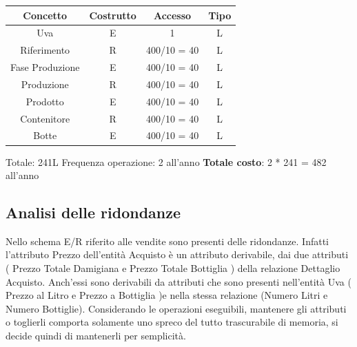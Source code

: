 \documentclass{article}
\begin{document}
\begin{itemize}
\begin{tabular}{c|c|c|c}
    \textbf{Concetto} & \textbf{Costrutto} &  \textbf{Accesso} & \textbf{Tipo} \\\hline
    Uva & E & 1 & L\\\hline
    Riferimento & R & 400/10 = 40 & L \\\hline
    Fase Produzione& E & 400/10 = 40 & L\\\hline
    Produzione & R & 400/10 = 40 & L \\\hline
    Prodotto & E & 400/10 = 40  & L\\\hline
    Contenitore & R & 400/10 = 40 & L \\\hline
    Botte& E & 400/10 = 40 & L\\\hline
\end{tabular}
\newline
Totale: 241L \qquad \qquad Frequenza operazione: 2 all'anno
\newline
\newline
\textbf{Totale costo}: 2 * 241 = 482 all'anno\\
\end{itemize}
\subsection{Analisi delle ridondanze}
Nello schema E/R riferito alle vendite sono presenti delle ridondanze. 
Infatti l'attributo Prezzo dell'entità Acquisto è un attributo derivabile, dai due attributi ( Prezzo Totale Damigiana e Prezzo Totale Bottiglia ) della relazione Dettaglio Acquisto.
Anch'essi sono derivabili da attributi che sono presenti nell'entità Uva ( Prezzo al Litro e Prezzo a Bottiglia )e nella stessa relazione (Numero Litri e Numero Bottiglie).
Considerando le operazioni eseguibili, mantenere gli attributi o toglierli comporta solamente uno spreco del tutto trascurabile di memoria, si decide quindi di mantenerli per semplicità. 
\newpage
\end{document}
